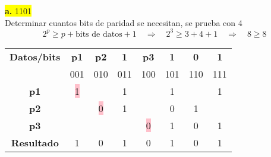\documentclass{article}
\begin{document}
	\begin{center}
		\hspace{3cm}\colorbox{yellow}{{\textbf{a.} 1101}}\newline
		\\Determinar cuantos bits de paridad se necesitan, se prueba con 4
		\[
		2^p \geq p + \text{bits de datos} + 1
		\quad \Rightarrow \quad	2^3 \geq 3 + 4 + 1 \quad \Rightarrow \quad 8 \geq 8
		\]
		
		\begin{table}[h!]
			\centering
			\begin{tabular}{c|ccccccc}
				\toprule
				\textbf{Datos/bits} & \textbf{p1} & \textbf{p2} & \textbf{1} & \textbf{p3} & \textbf{1} & \textbf{0} & \textbf{1}\\ & \scriptsize001 & \scriptsize010 & \scriptsize011 & \scriptsize100 & \scriptsize101 & \scriptsize110 & \scriptsize111\\
				\midrule
				\textbf{p1} & \colorbox{pink}{1} & & 1 & & 1 & & 1\\
				\midrule
				\textbf{p2} &  & \colorbox{pink}{0} & 1 & & 0 & 1  \\
				\midrule
				\textbf{p3} & & & & \colorbox{pink}{0} & 1 & 0 & 1 \\
				\midrule
				\textbf{Resultado} & 1 & 0 & 1 & 0 & 1 & 0 & 1\\
				\bottomrule
			\end{tabular}
		\end{table}
	\end{center}
	
\end{document}

